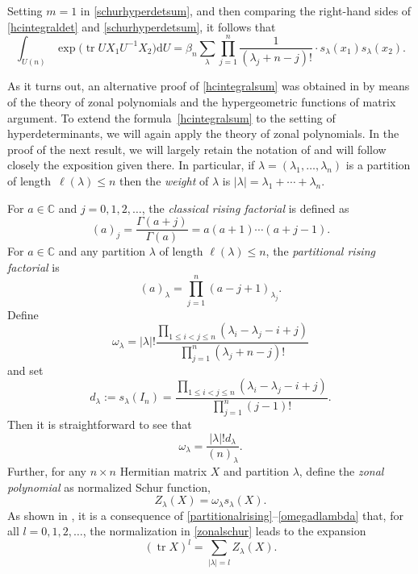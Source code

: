 \documentclass[pdftex]{sigma}
\numberwithin{equation}{section}
\def\C{{\mathbb C}}
\def\dd{ \mathrm{d}}
\def\tr{\operatorname{tr} }
\begin{document}
Setting $m=1$ in \eqref{schurhyperdetsum}, and then comparing the right-hand sides of \eqref{hcintegraldet} and \eqref{schurhyperdetsum}, it follows that
\begin{equation}
\int_{U(n)} \exp\bigl(\tr UX_1U^{-1}X_2\bigr) \dd U = \beta_n \sum_\lambda \prod_{j=1}^n \frac{1}{(\lambda_j + n-j)!} \cdot s_\lambda(x_1) s_\lambda(x_2).\label{hcintegralsum}
\end{equation}

As it turns out, an alternative proof of \eqref{hcintegralsum} was obtained in \cite{grossrichards89} by means of the theory of zonal polynomials and the hypergeometric functions of matrix argument. To extend the formula~\eqref{hcintegralsum} to the setting of hyperdeterminants, we will again apply the theory of zonal polynomials. In the proof of the next result, we will largely retain the notation of \cite[Section 2]{grossrichards89} and will follow closely the exposition given there. In particular, if $\lambda = (\lambda_1,\dots,\lambda_n)$ is a partition of length~${\ell(\lambda) \le n}$ then the {\it weight} of $\lambda$ is $|\lambda| = \lambda_1+\cdots+\lambda_n$.

For $a \in \C$ and $j = 0,1,2,\dots$, the {\it classical rising factorial} is defined as
\begin{equation}
(a)_j = \frac{\Gamma(a+j)}{\Gamma(a)} = a(a+1)\cdots (a+j-1).\label{classicalrising}
\end{equation}
For $a \in \C$ and any partition $\lambda$ of length $\ell(\lambda) \le n$, the {\it partitional rising factorial} is
\begin{equation}
(a)_\lambda = \prod_{j=1}^n (a-j+1)_{\lambda_j}.\label{partitionalrising}
\end{equation}
Define
\[%
\omega_\lambda = |\lambda|!
\frac{\prod_{1 \le i<j \le n} (\lambda_i-\lambda_j-i+j)}{\prod_{j=1}^n (\lambda_j+n-j)!}
\]
and set
\[%
d_\lambda := s_\lambda(I_n) = \frac{\prod_{1 \le i<j \le n} (\lambda_i-\lambda_j-i+j)}{\prod_{j=1}^n (j-1)!}.
\]
Then it is straightforward to see that
\begin{equation}
\omega_\lambda = \frac{|\lambda|! d_\lambda}{(n)_\lambda}.\label{omegadlambda}
\end{equation}
Further, for any $n \times n$ Hermitian matrix $X$ and partition $\lambda$, define the {\it zonal polynomial} as normalized Schur function,
\begin{equation}
Z_\lambda(X) = \omega_\lambda s_\lambda(X).\label{zonalschur}
\end{equation}
As shown in \cite[Section 2]{grossrichards89}, it is a consequence of \eqref{partitionalrising}--\eqref{omegadlambda} that, for all $l=0,1,2,\dots$, the normalization in \eqref{zonalschur} leads to the expansion
\begin{equation}
(\tr X)^l = \sum_{|\lambda| = l} Z_\lambda(X).\label{eq_tracepowers}
\end{equation}
\end{document}
